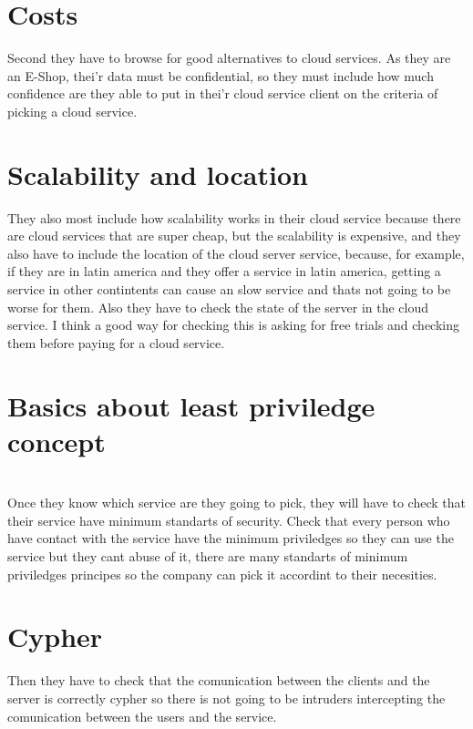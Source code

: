 \documentclass[10pt,a4paper]{article} %
\begin{document}
    \section{Costs}
        Second they have to browse for good alternatives to
        cloud services. As they are an E-Shop, thei'r data must be
        confidential, so they must include how much confidence are they able to
        put in thei'r cloud service client on the criteria of picking a cloud
        service. 
     \section{Scalability and location}
        They also most include how scalability works in their cloud
        service because there are cloud services that are super cheap, but the
        scalability is expensive, and they also have to include the location of
        the cloud server service, because, for example, if they are in latin
        america and they offer a service in latin america, getting a service in
        other contintents can cause an slow service and thats not going to be
        worse for them. Also they have to check the state of the server in the
        cloud service. I think a good way for checking this is asking for free
        trials and checking them before paying for a cloud service. 

     \section{Basics about least priviledge concept}
        \\Once they know which service are they going to pick, they will have to
        check that their service have minimum standarts of security. Check
        that every person who have contact with the service have the minimum
        priviledges so they can use the service but they cant abuse of it,
        there are many standarts of minimum priviledges principes so the
        company can pick it accordint to their necesities. 

    \section{Cypher }
        Then
        they have to check that the comunication between the clients and the
        server is correctly cypher so there is not going to be intruders
        intercepting the comunication between the users and the service. 
        
\end{document}
